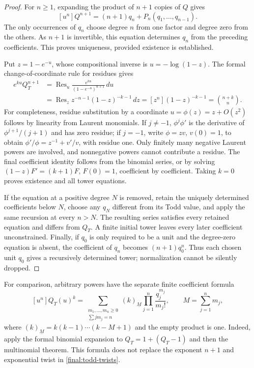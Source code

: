 \begin{proof}
For $n\geq1$, expanding the product of $n+1$ copies of $Q$ gives
\[
 [u^n]Q^{n+1}=(n+1)q_n+P_n(q_1,\ldots,q_{n-1}).
\]
The only occurrences of $q_n$ choose degree $n$ from one factor and
degree zero from the others.  As $n+1$ is invertible, this equation
determines $q_n$ from the preceding coefficients.  This proves
uniqueness, provided existence is established.

Put $z=1-e^{-u}$, whose compositional inverse is $u=-\log(1-z)$.
The formal change-of-coordinate rule for residues gives
\begin{align*}
 [u^n]e^{ku}Q_T^{n+1}
 &=\operatorname{Res}_u\frac{e^{ku}}{(1-e^{-u})^{n+1}}\,du\\
 &=\operatorname{Res}_z z^{-n-1}(1-z)^{-k-1}\,dz
   =[z^n](1-z)^{-k-1}
   =\binom{n+k}{n}.
\end{align*}
For completeness, residue substitution by a coordinate
$u=\phi(z)=z+O(z^2)$ follows by linearity from Laurent monomials.
If $j\ne-1$, $\phi^j\phi'$ is the derivative of
$\phi^{j+1}/(j+1)$ and has zero residue; if $j=-1$, write
$\phi=zv$, $v(0)=1$, to obtain
$\phi'/\phi=z^{-1}+v'/v$, with residue one.  Only finitely many
negative Laurent powers are involved, and nonnegative powers cannot
contribute a residue.  The final coefficient identity follows from
the binomial series, or by solving
$(1-z)F'=(k+1)F$, $F(0)=1$, coefficient by coefficient.
Taking $k=0$ proves existence and all tower equations.

If the equation at a positive degree $N$ is removed, retain the
uniquely determined coefficients below $N$, choose any $q_N$ different
from its Todd value, and apply the same recursion at every $n>N$.
The resulting series satisfies every retained equation and differs
from $Q_T$.  A finite initial tower leaves every later coefficient
unconstrained.  Finally, if $q_0$ is only required to be a unit and the
degree-zero equation is absent, the coefficient of $q_n$ becomes
$(n+1)q_0^n$.  Thus each chosen unit $q_0$ gives a recursively determined
tower; normalization cannot be silently dropped.
\end{proof}

For comparison, arbitrary powers have the separate finite coefficient
formula
\begin{equation}\label{final:todd-arbitrary-power}
 [u^n]Q_T(u)^k=
 \sum_{\substack{m_1,\ldots,m_n\geq0\\\sum j m_j=n}}
 (k)_{\underline M}\prod_{j=1}^n\frac{q_j^{m_j}}{m_j!},
 \qquad M=\sum_{j=1}^n m_j,
\end{equation}
where $(k)_{\underline M}=k(k-1)\cdots(k-M+1)$ and the
empty product is one.  Indeed, apply the formal binomial expansion
to $Q_T=1+(Q_T-1)$ and then the multinomial theorem.  This formula
does not replace the exponent $n+1$ and exponential twist in
\eqref{final:todd-twists}.

